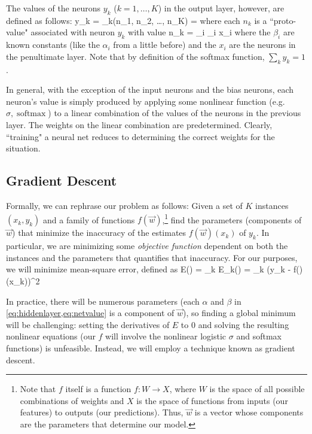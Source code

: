 \documentclass[10pt]{article}
\DeclareMathOperator{\softmax}{softmax}
\begin{document}
The values of the neurons $y_k$ ($k = 1, \dots, K$) in the output layer, however, are defined as follows:
\beq
y_k = \softmax_k(n_1, n_2, \dots, n_K) = 
\eeq
where each $n_k$ is a ``proto-value" associated with neuron $y_k$ with value
\beq
\label{eq:netvalue}
n_k = \sum_i \beta_i x_i
\eeq
where the $\beta_i$ are known constants (like the $\alpha_i$ from a little before) and the $x_i$ are the neurons in the penultimate layer.
Note that by definition of the softmax function, $\sum_k y_k = 1$.

In general, with the exception of the input neurons and the bias neurons, each neuron's value is simply produced by applying some nonlinear function (e.g. $\sigma, \softmax$) to a linear combination of the values of the neurons in the previous layer.
The weights on the linear combination are predetermined.
Clearly, ``training" a neural net reduces to determining the correct weights for the situation.

\subsection{Gradient Descent}

Formally, we can rephrase our problem as follows: Given a set of $K$ instances $(x_k, y_k)$ and a family of functions $f(\vec{w})$,\footnote{Note that $f$ itself is a function $f:W\to X$, where $W$ is the space of all possible combinations of weights and $X$ is the space of functions from inputs (our features) to outputs (our predictions). Thus, $\vec{w}$ is a vector whose components are the parameters that determine our model.} find the parameters (components of $\vec{w}$) that minimize the inaccuracy of the estimates $f(\vec{w})(x_k)$ of $y_k$.
In particular, we are minimizing some \emph{objective function} dependent on both the instances and the parameters that quantifies that inaccuracy.
For our purposes, we will minimize mean-square error, defined as
\beq
\label{eq:meansqerror}
E() = \sum_k E_k() = \sum_k (y_k - f()(x_k))^2
\eeq

In practice, there will be numerous parameters (each $\alpha$ and $\beta$ in \cref{eq:hiddenlayer,eq:netvalue} is a component of $\vec{w}$), so finding a global minimum will be challenging: setting the derivatives of $E$ to 0 and solving the resulting nonlinear equations (our $f$ will involve the nonlinear logistic $\sigma$ and softmax functions) is unfeasible.
Instead, we will employ a technique known as gradient descent.
\end{document}
